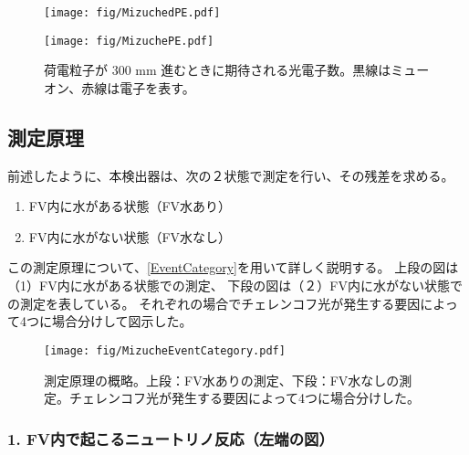 \begin{figure}[htbp]
  \begin{minipage}{0.47\textwidth}
    \centering
    \texttt{[image: fig/MizuchedPE.pdf]}
    \caption[Mizucheで検出できる単位飛程あたりの光電子数]{Mizucheで検出できる単位飛程あたり光電子数。光電被覆率\qty{6.24}{\percent}、量子効率\qty{19}{\percent}とした。黒線はミューオン、赤線は電子を表す。}
    \label{MizuchedPE}
  \end{minipage}
  \hfill
  \begin{minipage}{0.47\textwidth}
    \centering
    \texttt{[image: fig/MizuchePE.pdf]}
    \caption[荷電粒子が 300 mm 進むときに期待される光電子数数]{荷電粒子が 300 mm 進むときに期待される光電子数。黒線はミューオン、赤線は電子を表す。}
    \label{MizuchePE}
  \end{minipage}
\end{figure}

\newpage

\subsection{測定原理}

前述したように、本検出器は、次の２状態で測定を行い、その残差を求める。

\begin{enumerate}
\item FV内に水がある状態（FV水あり）
\item FV内に水がない状態（FV水なし）
\end{enumerate}

この測定原理について、\autoref{EventCategory}を用いて詳しく説明する。
上段の図は（1）FV内に水がある状態での測定、
下段の図は（２）FV内に水がない状態での測定を表している。
それぞれの場合でチェレンコフ光が発生する要因によって4つに場合分けして図示した。

\begin{figure}[htbp]
\centering
\texttt{[image: fig/MizucheEventCategory.pdf]}
\caption[測定原理の概略]{測定原理の概略。上段：FV水ありの測定、下段：FV水なしの測定。チェレンコフ光が発生する要因によって4つに場合分けした。}
\label{EventCategory}
\end{figure}

\subsubsection{1. FV内で起こるニュートリノ反応（左端の図）}

